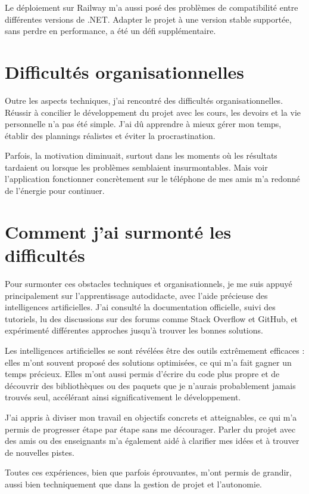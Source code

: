 \documentclass[12pt]{report}
\begin{document}
Le déploiement sur Railway m’a aussi posé des problèmes de compatibilité entre différentes versions de .NET. Adapter le projet à une version stable supportée, sans perdre en performance, a été un défi supplémentaire.

\section{Difficultés organisationnelles}

Outre les aspects techniques, j’ai rencontré des difficultés organisationnelles. Réussir à concilier le développement du projet avec les cours, les devoirs et la vie personnelle n’a pas été simple. J’ai dû apprendre à mieux gérer mon temps, établir des plannings réalistes et éviter la procrastination.

Parfois, la motivation diminuait, surtout dans les moments où les résultats tardaient ou lorsque les problèmes semblaient insurmontables. Mais voir l’application fonctionner concrètement sur le téléphone de mes amis m’a redonné de l’énergie pour continuer.

\section{Comment j’ai surmonté les difficultés}

Pour surmonter ces obstacles techniques et organisationnels, je me suis appuyé principalement sur l’apprentissage autodidacte, avec l’aide précieuse des intelligences artificielles. J’ai consulté la documentation officielle, suivi des tutoriels, lu des discussions sur des forums comme Stack Overflow et GitHub, et expérimenté différentes approches jusqu’à trouver les bonnes solutions.

Les intelligences artificielles se sont révélées être des outils extrêmement efficaces : elles m’ont souvent proposé des solutions optimisées, ce qui m’a fait gagner un temps précieux. Elles m’ont aussi permis d’écrire du code plus propre et de découvrir des bibliothèques ou des paquets que je n’aurais probablement jamais trouvés seul, accélérant ainsi significativement le développement.

J’ai appris à diviser mon travail en objectifs concrets et atteignables, ce qui m’a permis de progresser étape par étape sans me décourager. Parler du projet avec des amis ou des enseignants m’a également aidé à clarifier mes idées et à trouver de nouvelles pistes.

Toutes ces expériences, bien que parfois éprouvantes, m’ont permis de grandir, aussi bien techniquement que dans la gestion de projet et l’autonomie.
\end{document}
